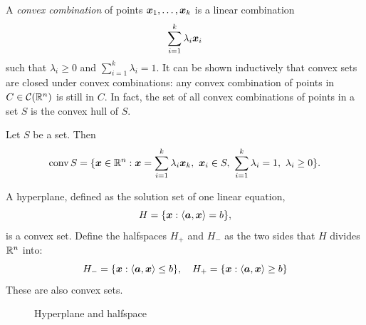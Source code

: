 A {\em convex combination} of points $\bm{x}_1,\dots,\bm{x}_k$ is a linear combination
\begin{equation*}
 \sum_{i=1}^k \lambda_i \bm{x}_i
\end{equation*}
such that $\lambda_i\geq 0$ and $\sum_{i=1}^k \lambda_i = 1$. It can be shown inductively that convex sets are closed under convex combinations: any convex combination of points in $C\in \mathcal{C}(\mathbb{R}^n)$ is still in $C$. In fact, the set of all convex combinations of points in a set $S$ is the convex hull of $S$.

\begin{lemma}
 Let $S$ be a set. Then 
 \begin{equation*}
  \conv{S} = \{\vct{x}\in \R^n \mid \vct{x}=\sum_{i=1}^k \lambda_i \vct{x}_k, \ \vct{x}_i\in S, \ \sum_{i=1}^k \lambda_i = 1, \ \lambda_i\geq 0\}.
 \end{equation*}
\end{lemma}

\begin{example}
A hyperplane, defined as the solution set of one linear equation,
\begin{equation*}
 H = \{\bm{x} \mathrel{\mathop{:}} \langle {\bm{a}}, {\bm{x}} \rangle = b\},
\end{equation*}
is a convex set.
Define the halfspaces $H_+$ and $H_-$ as the two sides that $H$ divides $\mathbb{R}^n$ into:
\begin{equation*}
 H_- = \{\bm{x}\mathrel{\mathop{:}} \langle {\bm{a}}, {\bm{x}} \rangle\leq b\}, \quad H_+ = \{\bm{x}\mathrel{\mathop{:}} \langle {\bm{a}}, {\bm{x}} \rangle\geq b\}
\end{equation*}
These are also convex sets. 
\begin{figure}[h!]
\centering
{}
\caption{Hyperplane and halfspace}
\end{figure}
\end{example}


